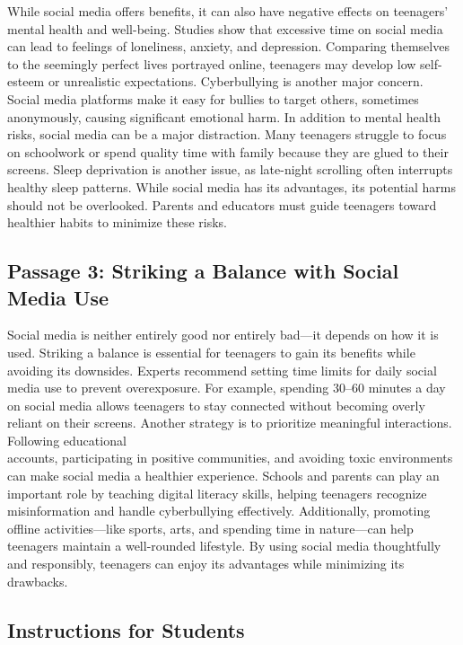\documentclass[12pt]{article}
\begin{document}
While social media offers benefits, it can also have negative effects on teenagers’ mental health and well-being. Studies show that excessive time on social media can lead to feelings of loneliness, anxiety, and depression. Comparing themselves to the seemingly perfect lives portrayed online, teenagers may develop low self-esteem or unrealistic expectations. Cyberbullying is another major concern. Social media platforms make it easy for bullies to target others, sometimes anonymously, causing significant emotional harm. In addition to mental health risks, social media can be a major distraction. Many teenagers struggle to focus on schoolwork or spend quality time with family because they are glued to their screens. Sleep deprivation is another issue, as late-night scrolling often interrupts healthy sleep patterns. While social media has its advantages, its potential harms should not be overlooked. Parents and educators must guide teenagers toward healthier habits to minimize these risks.

\subsection*{Passage 3: Striking a Balance with Social Media Use}

Social media is neither entirely good nor entirely bad—it depends on how it is used. Striking a balance is essential for teenagers to gain its benefits while avoiding its downsides. Experts recommend setting time limits for daily social media use to prevent overexposure. For example, spending 30–60 minutes a day on social media allows teenagers to stay connected without becoming overly reliant on their screens. Another strategy is to prioritize meaningful interactions. Following educational \\accounts, participating in positive communities, and avoiding toxic environments can make social media a healthier experience. Schools and parents can play an important role by teaching digital literacy skills, helping teenagers recognize\\ misinformation and handle cyberbullying effectively. Additionally, promoting offline activities—like sports, arts, and spending time in nature—can help teenagers maintain a well-rounded lifestyle. By using social media thoughtfully and responsibly, teenagers can enjoy its advantages while minimizing its drawbacks.
\newpage
\subsection*{Instructions for Students}
\end{document}

